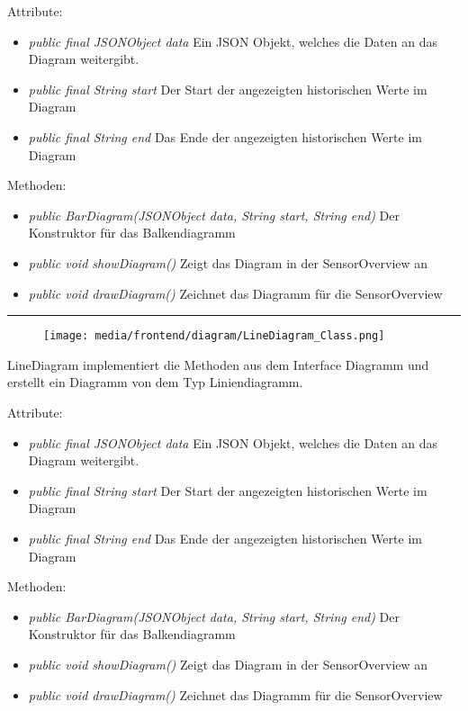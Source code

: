 Attribute:
\begin{itemize} 
    \item \emph{public final JSONObject data} Ein JSON Objekt, welches die Daten an das Diagram weitergibt.
    \item \emph{public final String start} Der Start der angezeigten historischen Werte im Diagram
    \item \emph{public final String end} Das Ende der angezeigten historischen Werte im Diagram
\end{itemize}   
Methoden:
\begin{itemize}      
    \item \emph{public BarDiagram(JSONObject data, String start, String end)} Der Konstruktor für das Balkendiagramm
    \item \emph{public void showDiagram()} Zeigt das Diagram in der SensorOverview an
    \item \emph{public void drawDiagram()} Zeichnet das Diagramm für die SensorOverview
\end{itemize}

\rule{\textwidth}{0.4pt} 
\begin{minipage}{0.3\textwidth}
    \begin{figure}[H]
        \texttt{[image: media/frontend/diagram/LineDiagram\_Class.png]}
    \end{figure}
    \end{minipage} \hfill
    \begin{minipage}{0.6\textwidth}
LineDiagram implementiert die Methoden aus dem Interface Diagramm und erstellt ein Diagramm von dem Typ Liniendiagramm.
\end{minipage}

Attribute:
\begin{itemize} 
    \item \emph{public final JSONObject data} Ein JSON Objekt, welches die Daten an das Diagram weitergibt.
    \item \emph{public final String start} Der Start der angezeigten historischen Werte im Diagram
    \item \emph{public final String end} Das Ende der angezeigten historischen Werte im Diagram
\end{itemize}   
Methoden:
\begin{itemize}      
    \item \emph{public BarDiagram(JSONObject data, String start, String end)} Der Konstruktor für das Balkendiagramm
    \item \emph{public void showDiagram()} Zeigt das Diagram in der SensorOverview an
    \item \emph{public void drawDiagram()} Zeichnet das Diagramm für die SensorOverview
\end{itemize}


